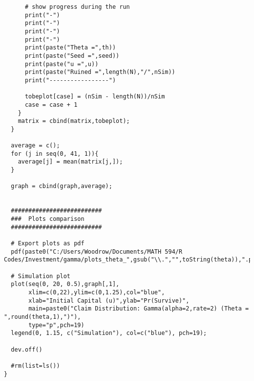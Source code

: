 \documentclass[12pt]{article}
\begin{document}
\begin{lstlisting}
      # show progress during the run
      print("-")
      print("-")
      print("-")
      print("-")
      print(paste("Theta =",th))
      print(paste("Seed =",seed))
      print(paste("u =",u))
      print(paste("Ruined =",length(N),"/",nSim))
      print("-----------------")
      
      tobeplot[case] = (nSim - length(N))/nSim
      case = case + 1
    }
    matrix = cbind(matrix,tobeplot);
  }
  
  average = c();
  for (j in seq(0, 41, 1)){
    average[j] = mean(matrix[j,]);
  }
  
  graph = cbind(graph,average);
  
  
  ##########################
  ###  Plots comparison
  ##########################
  
  # Export plots as pdf
  pdf(paste0("C:/Users/Woodrow/Documents/MATH 594/R Codes/Investment/gamma/plots_theta_",gsub("\\.","",toString(theta)),".pdf"))
  
  # Simulation plot
  plot(seq(0, 20, 0.5),graph[,1],
       xlim=c(0,22),ylim=c(0,1.25),col="blue",
       xlab="Initial Capital (u)",ylab="Pr(Survive)",
       main=paste0("Claim Distribution: Gamma(alpha=2,rate=2) (Theta = ",round(theta,1),")"),
       type="p",pch=19)
  legend(0, 1.15, c("Simulation"), col=c("blue"), pch=19);
  
  dev.off()
  
  #rm(list=ls())
}
\end{lstlisting}
\end{document}
